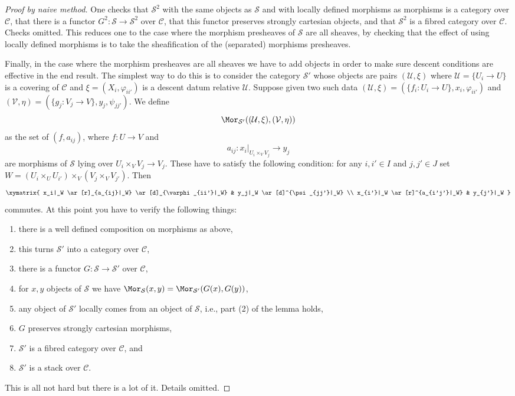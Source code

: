 \begin{proof}[Proof by naive method]
\medskip\noindent
One checks that $\mathcal{S}^2$ with the same objects as
$\mathcal{S}$ and with locally defined morphisms as morphisms
is a category over $\mathcal{C}$, that there is a functor
$G^2 : \mathcal{S} \to \mathcal{S}^2$ over $\mathcal{C}$,
that this functor preserves strongly cartesian objects,
and that $\mathcal{S}^2$ is a fibred category over $\mathcal{C}$.
Checks omitted. This reduces one to the case where the
morphism presheaves of $\mathcal{S}$ are all sheaves, by
checking that the effect of using locally defined morphisms
is to take the sheafification of the (separated) morphisms
presheaves.

\medskip\noindent
Finally, in the case where the morphism presheaves are all sheaves
we have to add objects in order to make sure descent conditions are
effective in the end result. The simplest way to do this is to
consider the category $\mathcal{S}'$ whose objects are
pairs $(\mathcal{U}, \xi)$ where
$\mathcal{U} = \{U_i \to U\}$ is a covering of $\mathcal{C}$ and
$\xi = (X_i, \varphi_{ii'})$ is a descent datum relative $\mathcal{U}$.
Suppose given two such data
$(\mathcal{U}, \xi) = (\{f_i : U_i \to U\},  x_i, \varphi_{ii'})$ and
$(\mathcal{V}, \eta) = (\{g_j : V_j \to V\},  y_j, \psi_{jj'})$.
We define
$$
\Mor_{\mathcal{S}'}((\mathcal{U}, \xi), (\mathcal{V}, \eta))
$$
as the set of $(f, a_{ij})$, where $f : U \to V$ and
$$
a_{ij} :
x_i|_{U_i \times_V V_j}
\longrightarrow
y_j
$$
are morphisms of $\mathcal{S}$ lying over $U_i \times_V V_j \to V_j$.
These have to satisfy the following condition: for any
$i, i' \in I$ and $j, j' \in J$ set
$W = (U_i \times_U U_{i'}) \times_V (V_j \times_V V_{j'})$. Then
$$
\xymatrix{
x_i|_W \ar[r]_{a_{ij}|_W} \ar[d]_{\varphi_{ii'}|_W} &
y_j|_W \ar[d]^{\psi_{jj'}|_W} \\
x_{i'}|_W \ar[r]^{a_{i'j'}|_W} &
y_{j'}|_W
}
$$
commutes. At this point you have to verify the following things:
\begin{enumerate}
\item there is a well defined composition on morphisms as above,
\item this turns $\mathcal{S}'$ into a category over $\mathcal{C}$,
\item there is a functor $G : \mathcal{S} \to \mathcal{S}'$ over $\mathcal{C}$,
\item for $x, y$ objects of $\mathcal{S}$ we have
$\Mor_\mathcal{S}(x, y) = \Mor_{\mathcal{S}'}(G(x), G(y))$,
\item any object of $\mathcal{S}'$ locally comes from an object of
$\mathcal{S}$, i.e., part (2) of the lemma holds,
\item $G$ preserves strongly cartesian morphisms,
\item $\mathcal{S}'$ is a fibred category over $\mathcal{C}$, and
\item $\mathcal{S}'$ is a stack over $\mathcal{C}$.
\end{enumerate}
This is all not hard but there is a lot of it. Details omitted.
\end{proof}

